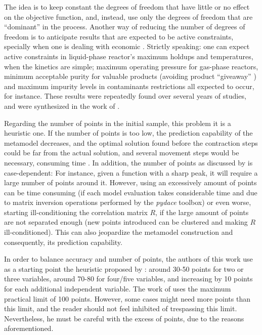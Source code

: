 \documentclass[../msc-thesis.tex]{subfiles}
\begin{document}
The idea is to keep constant the degrees of freedom that have little or no 
effect on the objective function, and, instead, use only the degrees of 
freedom that are ``dominant'' in the process. Another way of reducing the 
number of degrees of freedom is to anticipate results that are expected to 
be active constraints, specially when one is dealing with economic \soc. 
Strictly speaking: one can expect active constraints in liquid-phase reactor's 
maximum holdups and temperatures, when the kinetics are simple; maximum 
operating pressure for gas-phase reactors, minimum acceptable purity for 
valuable products (avoiding product ``giveaway'' \cite{Jacobsen2011}) and 
maximum impurity levels in contaminants restrictions all expected to occur, 
for instance. These results were repeatedly found over several years of \soc 
studies, and were synthesized in the work of \textcite{Minasidis2015}.

Regarding the number of points in the initial sample, this problem it is a 
heuristic one. If the number of points is too low, the prediction capability of 
the metamodel decreases, and the optimal solution found before the contraction 
steps could be far from the actual solution, and several movement steps would 
be necessary, consuming time \cite{Caballero2008}. In addition, the number of 
points as discussed by \textcite{Caballero2008} is case-dependent: For instance, 
given a function with a sharp peak, it will require a large number of points 
around it. However, using an excessively amount of points can be time consuming 
(if each model evaluation takes considerable time and due to matrix inversion 
operations performed by the \textit{pydace} toolbox) or even worse, starting 
ill-conditioning the correlation matrix $R$, if the large amount of points are 
not separated enough (new points introduced can be clustered and making $R$ 
ill-conditioned). This can also jeopardize the \kriging metamodel construction 
and consequently, its prediction capability.

In order to balance accuracy and number of points, the authors of this work use 
as a starting point the heuristic proposed by \cite{Caballero2008}: around 
30-50 points for two or three variables, around 70-80 for four/five variables, 
and increasing by 10 points for each additional independent variable. The work 
of \textcite{Caballero2008} uses the maximum practical limit of 100 points. 
However, some cases might need more points than this limit, and the reader 
should not feel inhibited of trespassing this limit. Nevertheless, he must be 
careful with the excess of points, due to the reasons aforementioned.
\end{document}
